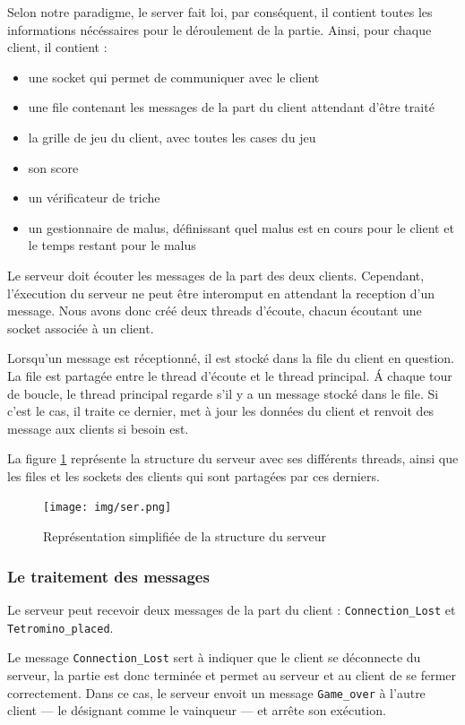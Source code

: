 \documentclass[a4paper, 12pt]{article}
\begin{document}
		Selon notre paradigme, le server fait loi, par conséquent, il contient toutes les informations nécéssaires pour le déroulement de la partie. Ainsi, pour chaque client, il contient : 
			\begin{itemize}
				\item une socket qui permet de communiquer avec le client
				\item une file contenant les messages de la part du client attendant d'être traité
				\item la grille de jeu du client, avec toutes les cases du jeu
				\item son score
				\item un vérificateur de triche
				\item un gestionnaire de malus, définissant quel malus est en cours pour le client et le temps restant pour le malus
			\end{itemize}

		Le serveur doit écouter les messages de la part des deux clients. Cependant, l'éxecution du serveur ne peut être interomput en attendant la reception d'un message. Nous avons donc créé deux threads d'écoute, chacun écoutant une socket associée à un client. 

		Lorsqu'un message est réceptionné, il est stocké dans la file du client en question. La file est partagée entre le thread d'écoute et le thread principal. \'A chaque tour de boucle, le thread principal regarde s'il y a un message stocké dans le file. Si c'est le cas, il traite ce dernier, met à jour les données du client et renvoit des message aux clients si besoin est.

		La figure \ref{fig:ser} représente la structure du serveur avec ses différents threads, ainsi que les files et les sockets des clients qui sont partagées par ces derniers.

		\begin{figure}[bt]
			\centering
			\texttt{[image: img/ser.png]}
			\caption{Représentation simplifiée de la structure du serveur}
			\label{fig:ser}
		\end{figure}

		\subsubsection{Le traitement des messages}
			Le serveur peut recevoir deux messages de la part du client : \texttt{Connection\_Lost} et \texttt{Tetromino\_placed}.

			Le message \texttt{Connection\_Lost} sert à indiquer que le client se déconnecte du serveur, la partie est donc terminée et permet au serveur et au client de se fermer correctement. Dans ce cas, le serveur envoit un message \texttt{Game\_over} à l'autre client --- le désignant comme le vainqueur --- et arrête son exécution.
\end{document}
